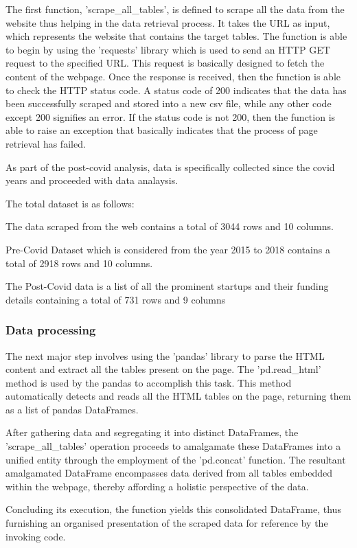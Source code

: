 \documentclass[12pt]{article}
\begin{document}
The first function, 'scrape\_all\_tables', is defined to scrape all the data from the website thus helping in the data retrieval process. It takes the URL as input, which represents the website that contains the target tables. The function is able to begin by using the 'requests' library which is used to send an HTTP GET request to the specified URL. This request is basically designed to fetch the content of the webpage.
Once the response is received, then the function is able to check the HTTP status code. A status code of 200 indicates that the data has been successfully scraped and stored into a new csv file, while any other code except 200 signifies an error. If the status code is not 200, then the function is able to raise an exception that basically indicates that the process of page retrieval has failed.

As part of the post-covid analysis, data is specifically collected since the covid years and proceeded with data analaysis. 

The total dataset is as follows:

The data scraped from the web contains a total of 3044 rows and 10 columns.

Pre-Covid Dataset which is considered from the year 2015 to 2018 contains a total of 2918 rows and 10 columns.

The Post-Covid data is a list of all the prominent startups and their funding details containing a total of 731 rows and 9 columns


\subsubsection{Data processing}
The next major step involves using the 'pandas' library to parse the HTML content and extract all the tables present on the page. The 'pd.read\_html' method is used by the pandas to accomplish this task. This method automatically detects and reads all the HTML tables on the page, returning them as a list of pandas DataFrames.

After gathering data and segregating it into distinct DataFrames, the 'scrape\_all\_tables' operation proceeds to amalgamate these DataFrames into a unified entity through the employment of the 'pd.concat' function. The resultant amalgamated DataFrame encompasses data derived from all tables embedded within the webpage, thereby affording a holistic perspective of the data.

Concluding its execution, the function yields this consolidated DataFrame, thus furnishing an organised presentation of the scraped data for reference by the invoking code.
\end{document}
